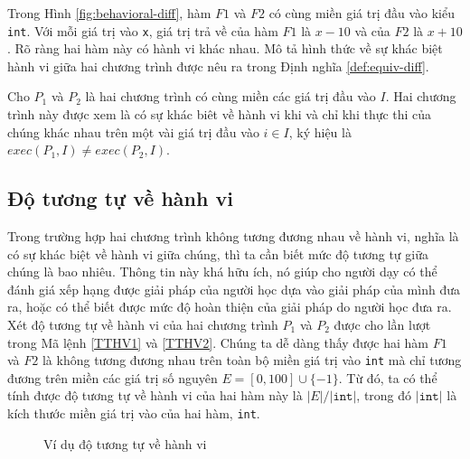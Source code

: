 Trong Hình \ref{fig:behavioral-diff}, hàm $F1$ và $F2$ có cùng miền
giá trị đầu vào kiểu \texttt{int}. Với mỗi giá trị vào \texttt{x}, giá
trị trả về của hàm $F1$ là $x - 10$ và của $F2$ là $x + 10$. Rõ ràng
hai hàm này có hành vi khác nhau. Mô tả hình thức về sự khác biệt hành
vi giữa hai chương trình được nêu ra trong Định nghĩa
\ref{def:equiv-diff}.

\begin{definition}
  \label{def:equiv-diff}
  Cho $P_{1}$ và $P_{2}$ là hai chương trình có cùng miền các giá trị
  đầu vào $I$. Hai chương trình này được xem là có sự khác biêt về
  hành vi khi và chỉ khi thực thi của chúng khác nhau trên một vài giá
  trị đầu vào $i \in I$, ký hiệu là
  $exec(P_{1}, I) \neq exec(P_{2}, I)$.
\end{definition}

\subsection{Độ tương tự về hành vi}

Trong trường hợp hai chương trình không tương đương nhau về hành vi,
nghĩa là có sự khác biệt về hành vi giữa chúng, thì ta cần biết mức độ
tương tự giữa chúng là bao nhiêu. Thông tin này khá hữu ích, nó giúp
cho người dạy có thể đánh giá xếp hạng được giải pháp của người học
dựa vào giải pháp của mình đưa ra, hoặc có thể biết được mức độ hoàn
thiện của giải pháp do người học đưa ra. Xét độ tương tự về hành vi
của hai chương trình $P_{1}$ và $P_{2}$ được cho lần lượt trong Mã
lệnh \ref{TTHV1} và \ref{TTHV2}. Chúng ta dễ dàng thấy được hai hàm
$F1$ và $F2$ là không tương đương nhau trên toàn bộ miền giá trị vào
\texttt{int} mà chỉ tương đương trên miền các giá trị số nguyên
$E = [0,100] \cup \{-1\}$. Từ đó, ta có thể tính được độ tương tự về
hành vi của hai hàm này là $|E| / |\texttt{int}|$, trong đó
$|\mathtt{int}|$ là kích thước miền giá trị vào của hai hàm,
\texttt{int}.

\begin{figure}[H]
	\centering
	\caption{Ví dụ độ tương tự về hành vi}
	\label{fig:behavioral-sim}
	\begin{minipage}[t]{0.45\linewidth}
	  
	\end{minipage}%
	\hfill\vrule\hfill
	\begin{minipage}[t]{0.45\linewidth}
	  
	\end{minipage}%
\end{figure}

